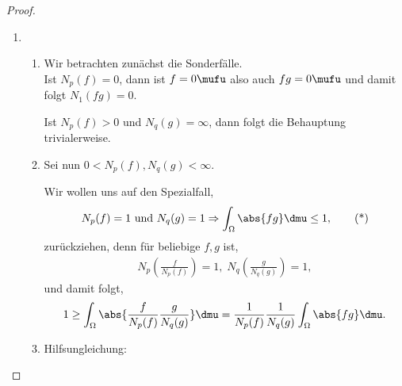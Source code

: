 \begin{proof}
\begin{enumerate}[label=\arabic{*}.)]
\item\begin{enumerate}[label=(\alph{*})]
\item Wir betrachten zunächst die Sonderfälle.\\
Ist $N_p(f) = 0$, dann ist
$f=0 \mufu$ also auch $fg=0 \mufu$ und damit folgt $N_1(fg) = 0$.

Ist $N_p(f) > 0$ und $N_q(g) = \infty$, dann folgt die Behauptung
trivialerweise.
\item Sei nun $0<N_p(f),N_q(g)<\infty$.

Wir wollen uns auf den Spezialfall,
\begin{align*}
N_p(f) = 1\text{ und }N_q(g)=1 \Rightarrow
\int_\Omega \abs{fg}\dmu \le 1,\tag{*}
\end{align*}
zurückziehen, denn für beliebige $f,g$ ist,
\begin{align*}
N_p\left(\frac{f}{N_p(f)} \right) = 1,\; N_q\left(\frac{g}{N_q(g)} \right) =1,
\end{align*}
und damit folgt,
\begin{align*}
1 \ge \int_\Omega \abs{\frac{f}{N_p(f)}\frac{g}{N_q(g)}} \dmu =
\frac{1}{N_p(f)}\frac{1}{N_q(g)} \int_\Omega \abs{fg}\dmu.
\end{align*}
\item Hilfsungleichung: 


\end{enumerate}
\end{enumerate}
\end{proof}
